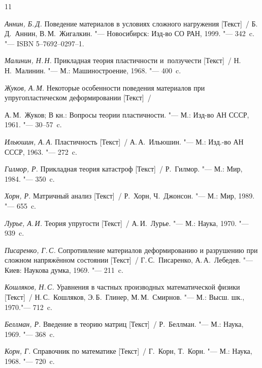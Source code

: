 \begin{thebibliography}{11}




\emph{Аннин, Б.\,Д.} Поведение материалов в условиях сложного нагружения [Текст]~/ Б.\,Д.~Аннин,  В.\,М.~Жигалкин. "--- Новосибирск: Изд-во СО РАН, 1999. "--- 342~c. "--- ISBN 5--7692--0297--1.




\emph{Малинин, Н.\,Н.} Прикладная теория пластичности и~ползучести [Текст]~/  Н.\,Н.~Малинин. "--- М.: Машиностроение, 1968. "--- 400~c.




\emph{Жуков, А.\,М.} Некоторые особенности поведения материалов при упругопластическом деформировании [Текст]~/

А.\,М.~Жуков; В кн.: Вопросы теории пластичности.  "--- М.: Изд-во АН СССР, 1961. "--- 30--57~c.




\emph{Ильюшин, А.\,А.} Пластичность  [Текст]~/ А.\,А.~Ильюшин. "--- М.: Изд.-во АН СССР, 1963. "--- 272~c.




\emph{Гилмор, Р.} Прикладная теория катастроф [Текст]~/ Р.~Гилмор. "--- М.: Мир, 1984. "--- 350~c.




\emph{Хорн, Р.} Матричный анализ [Текст]~/  Р.~Хорн,  Ч.~Джонсон. "--- М.: Мир, 1989. "--- 655~c.




\emph{Лурье, А.\,И.} Теория упругости [Текст]~/ А.\,И.~Лурье. "--- М.: Наука, 1970. "--- 939~c.




\emph{Писаренко, Г.\,С.} Сопротивление материалов деформированию и разрушению при сложном напряжённом состоянии [Текст]~/ Г.\,С.~Писаренко,  А.\,А.~Лебедев. "--- Киев: Наукова думка, 1969. "--- 211~c.




\emph{Кошляков, Н.\,С.} Уравнения в частных производных математической физики [Текст]~/ Н.\,С.~Кошляков,  Э.\,Б.~Глинер, М.\,М.~Смирнов.  "--- М.: Высш. шк., 1970."--- 712~c.




\emph{Беллман, Р.} Введение в теорию матриц [Текст]~/ Р.~Беллман.  "--- М.: Наука, 1969. "--- 368~c.




\emph{Корн, Г.} Справочник по математике [Текст]~/ Г.~Корн,  Т.~Корн. "--- М.: Наука, 1968. "--- 720~c.



\end{thebibliography}
